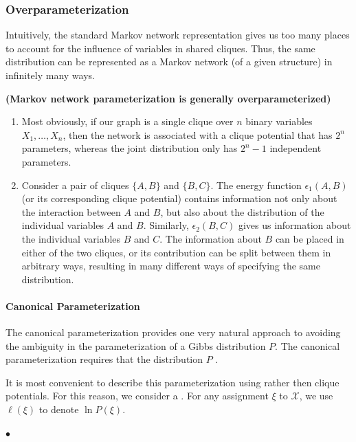 \documentclass{article}
\newcommand{\bfs}[1]{\textbf{({#1}) }}
\begin{document}
\subsubsection{Overparameterization}
Intuitively, the standard Markov network representation gives us too many places to account for the influence of variables in shared cliques. Thus, the same distribution can be represented as a Markov network (of a given structure) in infinitely many ways. 
\begin{exma}\bfs{Markov network parameterization is generally overparameterized}
\begin{enumerate}
    \item Most obviously, if our graph is a single clique over $n$ binary variables $X_{1}, \ldots, X_{n}$, then the network is associated with a clique potential that has $2^{n}$ parameters, whereas the joint distribution only has $2^{n}-1$ independent parameters.
    \item Consider a pair of cliques $\{A, B\}$ and $\{B, C\}$. The energy function $\epsilon_{1}(A, B)$ (or its corresponding clique potential) contains information not only about the interaction between $A$ and $B$, but also about the distribution of the individual variables $A$ and $B$. Similarly, $\epsilon_{2}(B, C)$ gives us information about the individual variables $B$ and $C$. The information about $B$ can be placed in either of the two cliques, or its contribution can be split between them in arbitrary ways, resulting in many different ways of specifying the same distribution.
\end{enumerate}
\end{exma}

\paragraph{Canonical Parameterization}
The canonical parameterization provides one very natural approach to avoiding the ambiguity in the parameterization of a Gibbs distribution $P$. The canonical parameterization requires that the distribution $P$ . 

It is most convenient to describe this parameterization using  rather then clique potentials. For this reason, we consider a . For any assignment $\xi$ to $\mathcal{X}$, we use $\ell(\xi)$ to denote $\ln P(\xi)$. 


$\bullet$ 
\end{document}
